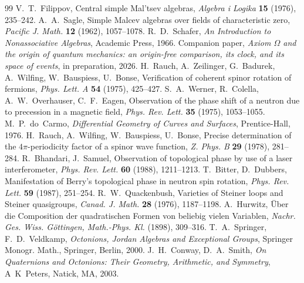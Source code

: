 \documentclass[11pt,reqno]{amsart}
\theoremstyle{definition}
\theoremstyle{remark}
\numberwithin{equation}{section}
\begin{document}
\begin{thebibliography}{99}
 V.~T.~Filippov, Central simple Mal'tsev algebras, \emph{Algebra i Logika} \textbf{15} (1976), 235--242.
 A.~A.~Sagle, Simple Malcev algebras over fields of characteristic zero, \emph{Pacific J. Math.} \textbf{12} (1962), 1057--1078.
 R.~D.~Schafer, \emph{An Introduction to Nonassociative Algebras}, Academic Press, 1966.
 Companion paper, \emph{Axiom $\Omega$ and the origin of quantum mechanics: an origin-free comparison, its clock, and its space of events}, in preparation, 2026.
 H.~Rauch, A.~Zeilinger, G.~Badurek, A.~Wilfing, W.~Bauspiess, U.~Bonse, Verification of coherent spinor rotation of fermions, \emph{Phys. Lett. A} \textbf{54} (1975), 425--427.
 S.~A.~Werner, R.~Colella, A.~W.~Overhauser, C.~F.~Eagen, Observation of the phase shift of a neutron due to precession in a magnetic field, \emph{Phys. Rev. Lett.} \textbf{35} (1975), 1053--1055.
 M.~P.~do~Carmo, \emph{Differential Geometry of Curves and Surfaces}, Prentice-Hall, 1976.
 H.~Rauch, A.~Wilfing, W.~Bauspiess, U.~Bonse, Precise determination of the $4\pi$-periodicity factor of a spinor wave function, \emph{Z. Phys. B} \textbf{29} (1978), 281--284.
 R.~Bhandari, J.~Samuel, Observation of topological phase by use of a laser interferometer, \emph{Phys. Rev. Lett.} \textbf{60} (1988), 1211--1213.
 T.~Bitter, D.~Dubbers, Manifestation of Berry's topological phase in neutron spin rotation, \emph{Phys. Rev. Lett.} \textbf{59} (1987), 251--254.
 R.~W.~Quackenbush, Varieties of Steiner loops and Steiner quasigroups, \emph{Canad. J. Math.} \textbf{28} (1976), 1187--1198.
 A.~Hurwitz, \"Uber die Composition der quadratischen Formen von beliebig vielen Variablen, \emph{Nachr. Ges. Wiss. G\"ottingen, Math.-Phys. Kl.} (1898), 309--316.
 T.~A.~Springer, F.~D.~Veldkamp, \emph{Octonions, Jordan Algebras and Exceptional Groups}, Springer Monogr. Math., Springer, Berlin, 2000.
 J.~H.~Conway, D.~A.~Smith, \emph{On Quaternions and Octonions: Their Geometry, Arithmetic, and Symmetry}, A~K~Peters, Natick, MA, 2003.

\end{thebibliography}
\end{document}
